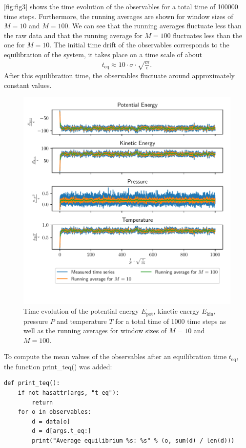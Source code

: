\documentclass[a4paper,10pt,bibtotoc]{scrartcl}
\begin{document}
\autoref{fig:fig3} shows the time evolution of the observables for a total time of 100000 time steps.
Furthermore, the running averages are shown for window sizes of $M=10$ and $M=100$.
We can see that the running averages fluctuate less than the raw data and that the running average for $M=100$ fluctuates less than the one for $M=10$.
The initial time drift of the observables corresponds to the equilibration of the system, it takes place on a time scale of about
\begin{align*}
t_\mathrm{eq}\approx 10\cdot\sigma\cdot\sqrt{\frac{m}{\epsilon}}.
\end{align*}
After this equilibration time, the observables fluctuate around approximately constant values.
\begin{figure}[H]
        \centering
        \includegraphics[width=\linewidth]{Figure_3.pdf}
    \caption{Time evolution of the potential energy $E_\mathrm{pot}$, kinetic energy $E_\mathrm{kin}$, pressure $P$ and temperature $T$ for a total time of 1000 time steps as well as the running averages for window sizes of $M=10$ and $M=100$.}
    \label{fig:fig3}
\end{figure}
To compute the mean values of the observables after an equilibration time $t_\mathrm{eq}$, the function print\_teq() was added:
\begin{lstlisting}
def print_teq():
    if not hasattr(args, "t_eq"):
        return
    for o in observables:
        d = data[o]
        d = d[args.t_eq:]
        print("Average equilibrium %s: %s" % (o, sum(d) / len(d)))
\end{lstlisting}
\end{document}
